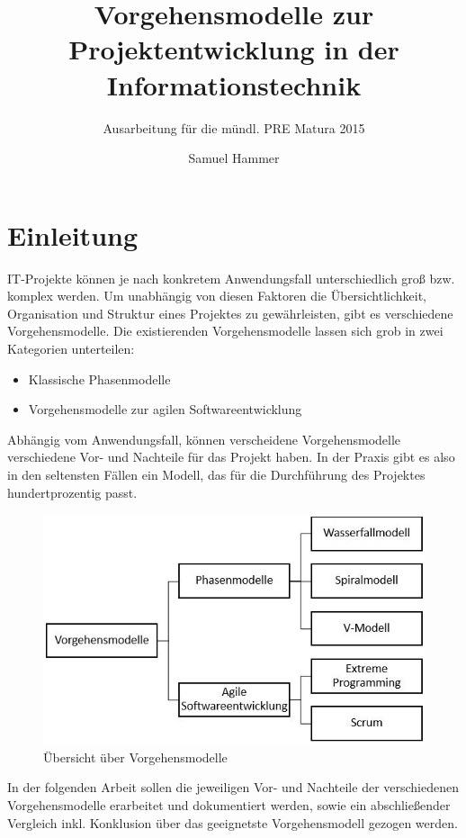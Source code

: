 \documentclass[a4paper, twopage]{scrreprt}
\author{Samuel Hammer}
\title{Vorgehensmodelle zur Projektentwicklung in der Informationstechnik}
\subtitle{Ausarbeitung für die mündl. PRE Matura 2015}
\begin{document}
\maketitle
\tableofcontents

\chapter{Einleitung}
\label{ch:einleitung}
IT-Projekte können je nach konkretem Anwendungsfall unterschiedlich groß bzw. komplex werden. Um unabhängig von diesen Faktoren die Übersichtlichkeit, Organisation und Struktur eines Projektes zu gewährleisten, gibt es verschiedene Vorgehensmodelle. \newline
Die existierenden Vorgehensmodelle lassen sich grob in zwei Kategorien unterteilen: 
\begin{itemize}
	\item Klassische Phasenmodelle
	\item Vorgehensmodelle zur agilen Softwareentwicklung
\end{itemize}
Abhängig vom Anwendungsfall, können verscheidene Vorgehensmodelle verschiedene Vor- und Nachteile für das Projekt haben. In der Praxis gibt es also in den seltensten Fällen ein Modell, das für die Durchführung des Projektes hundertprozentig passt. \par
\begin{figure}[h]
\centering
	\includegraphics[scale=0.6]{Images/vorgehensmodelle_diagramm}
	\caption{Übersicht über Vorgehensmodelle\label{fig:vorgehensmodelle_diagramm}}
\end{figure}
In der folgenden Arbeit sollen die jeweiligen Vor- und Nachteile der verschiedenen Vorgehensmodelle erarbeitet und dokumentiert werden, sowie ein abschließender Vergleich inkl. Konklusion über das geeignetste Vorgehensmodell gezogen werden.
\end{document}
